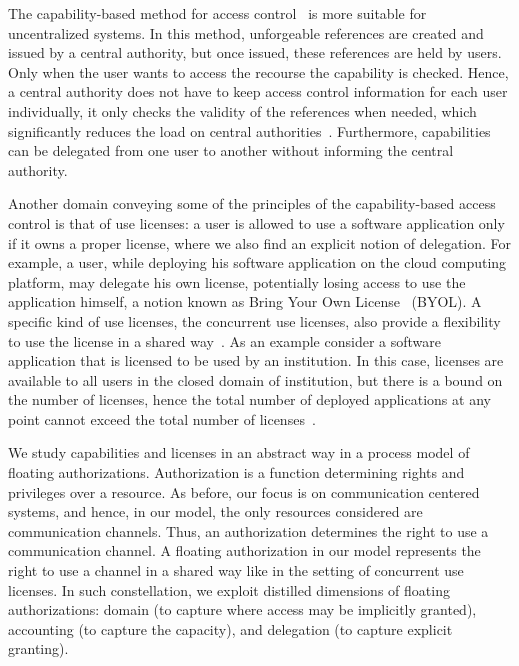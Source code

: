 The capability-based method for access control~\cite{sandhu1994access} is more suitable for uncentralized systems. 
In this method, unforgeable references are created and issued by a central authority, but once issued, these references are held by users. Only when the user wants to access 
the recourse the capability is checked. Hence, a central authority does not have to keep access control information for each user individually, it only checks the validity
of the references when needed, which  significantly reduces the load on central authorities~\cite{zhao2013behavioural}. 
Furthermore, capabilities can be delegated from one user to another without informing the central authority. 
%

Another domain conveying some of the principles of the capability-based access control is 
that of use licenses: a user is allowed to use a software application 
only if it owns a proper license, where we also find an explicit notion of delegation. 
For example, a user, while deploying his 
software application on the cloud computing platform, may delegate his own license, 
potentially losing access to use the application himself, 
a notion known as Bring Your Own License~\cite{byol} (BYOL). 
A specific kind of use licenses, the concurrent use licenses, also provide a flexibility to use the license in a shared way~\cite{baratti2003license}. 
As an example consider a software application that is licensed to be used by an institution. 
In this case, licenses are available to all users in the closed domain of institution, 
but there is a bound on the number of licenses, hence the total number of deployed applications at any point cannot exceed the total number of 
licenses~\cite{license_lp_comp}.

We study capabilities and licenses in an abstract way in
a process model of floating authorizations. 
Authorization is a function determining rights and privileges over a resource.
As before, our focus is on communication centered systems, and hence, 
in our model, the only resources considered are communication channels. 
Thus, an authorization determines the right to use a communication channel. 
A floating authorization in our model represents the right to use a channel in a shared way like in the setting of concurrent use licenses.
In such constellation, we exploit distilled dimensions of floating authorizations: 
domain (to capture where access may be implicitly granted), accounting (to capture the capacity), and delegation (to capture explicit granting).

